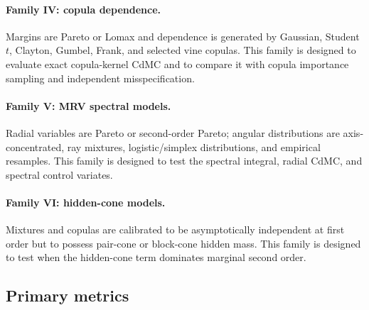 \paragraph{Family IV: copula dependence.}
Margins are Pareto or Lomax and dependence is generated by Gaussian, Student
\(t\), Clayton, Gumbel, Frank, and selected vine copulas. This family is
designed to evaluate exact copula-kernel CdMC and to compare it with copula
importance sampling and independent misspecification.

\paragraph{Family V: MRV spectral models.}
Radial variables are Pareto or second-order Pareto; angular distributions are
axis-concentrated, ray mixtures, logistic/simplex distributions, and empirical
resamples. This family is designed to test the spectral integral, radial
CdMC, and spectral control variates.

\paragraph{Family VI: hidden-cone models.}
Mixtures and copulas are calibrated to be asymptotically independent at first
order but to possess pair-cone or block-cone hidden mass. This family is
designed to test when the hidden-cone term dominates marginal second order.

\begin{table}[p]
\centering

\caption[Simulation design grid]{Simulation
design grid. Design columns (experiment, dependence class, estimators tested)
are populated; truth-method and outcome columns contain \xx{} placeholders
until the experiment runner writes the final CSV and table. The design
deliberately separates first-order dependence, hidden dependence, second-order
marginal behavior, and estimator availability.}
\label{tab:simulation-grid}
\end{table}

\subsection{Primary metrics}

